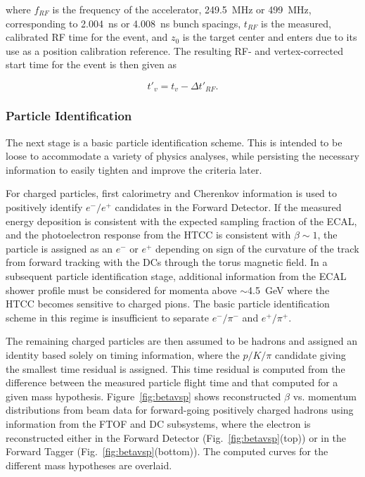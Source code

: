 \noindent
where $f_{RF}$ is the frequency of the accelerator, 249.5~MHz or 499~MHz, corresponding to 2.004~ns or 4.008~ns bunch
spacings, $t_{RF}$ is the measured, calibrated RF time for the event, and $z_0$ is the target center and enters
due to its use as a position calibration reference. The resulting RF- and vertex-corrected start time for the event
is then given as

\begin{equation}
  \label{eq:starttime}
t'_v = t_v - \Delta t'_{RF}.
\end{equation}

\subsubsection{Particle Identification}

The next stage is a basic particle identification scheme.  This is intended to be loose to accommodate a variety of
physics analyses, while persisting the necessary information to easily tighten and improve the criteria later.

For charged particles, first calorimetry and Cherenkov information is used to positively identify $e^-/e^+$
candidates in the Forward Detector. If the measured energy deposition is consistent with the expected sampling
fraction of the ECAL, and the photoelectron response from the HTCC is consistent with $\beta\sim1$, the particle
is assigned as an $e^-$ or $e^+$ depending on sign of the curvature of the track from forward tracking with the
DCs through the torus magnetic field. In a subsequent particle identification stage, additional information from the
ECAL shower profile must be considered for momenta above $\sim$4.5~GeV where the HTCC becomes sensitive to
charged pions. The basic particle identification scheme in this regime is insufficient to separate $e^-/\pi^-$ and
$e^+/\pi^+$.

The remaining charged particles are then assumed to be hadrons and assigned an identity based solely on timing
information, where the $p/K/\pi$ candidate giving the smallest time residual is assigned. This time residual is
computed from the difference between the measured particle flight time and that computed for a given mass
hypothesis. Figure~\ref{fig:betavsp} shows reconstructed $\beta$ vs. momentum distributions from beam data
for forward-going positively charged hadrons using information from the FTOF and DC subsystems, where the
electron is reconstructed either in the Forward Detector (Fig.~\ref{fig:betavsp}(top)) or in the Forward Tagger
(Fig.~\ref{fig:betavsp}(bottom)). The computed curves for the different mass hypotheses are overlaid.

